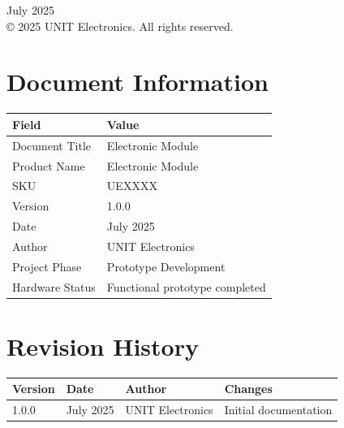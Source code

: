 \documentclass[11pt,a4paper]{article}
\begin{document}
\begin{titlepage}
    \vspace{1cm}
    
    {\large July 2025}\\[0.5cm]
    {\footnotesize © 2025 UNIT Electronics. All rights reserved.}
    
\end{titlepage}

\newpage
\thispagestyle{plain}

\section*{Document Information}

\begin{table}[H]
\centering
\begin{tabular}{ll}
\toprule
\textbf{Field} & \textbf{Value} \\
\midrule
Document Title & Electronic Module \\
Product Name & Electronic Module \\
SKU & UEXXXX \\
Version & 1.0.0 \\
Date & July 2025 \\
Author & UNIT Electronics \\
Project Phase & Prototype Development \\
Hardware Status & Functional prototype completed \\
\bottomrule
\end{tabular}
\end{table}

\vspace{1cm}

\section*{Revision History}

\begin{table}[H]
\centering
\begin{tabular}{llll}
\toprule
\textbf{Version} & \textbf{Date} & \textbf{Author} & \textbf{Changes} \\
\midrule
1.0.0 & July 2025 & UNIT Electronics & Initial documentation \\
\bottomrule
\end{tabular}
\end{table}

\newpage
\end{document}
